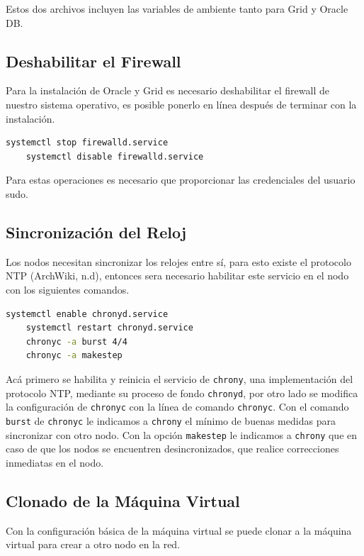 \documentclass{article}
\begin{document}
Estos dos archivos incluyen las variables de ambiente tanto para Grid y Oracle DB.

\subsection{Deshabilitar el Firewall}

Para la instalación de Oracle y Grid es necesario deshabilitar el firewall de nuestro sistema operativo, es posible ponerlo en línea después de terminar con la instalación.

\begin{lstlisting}[style=mystyle,language=bash]
	systemctl stop firewalld.service
	systemctl disable firewalld.service
\end{lstlisting}

Para estas operaciones es necesario que proporcionar las credenciales del usuario sudo.

\subsection{Sincronización del Reloj}

Los nodos necesitan sincronizar los relojes entre sí, para esto existe el protocolo NTP (ArchWiki, n.d), entonces sera necesario habilitar este servicio en el nodo con los siguientes comandos.

\begin{lstlisting}[style=mystyle,language=bash]
	systemctl enable chronyd.service
	systemctl restart chronyd.service
	chronyc -a burst 4/4
	chronyc -a makestep
\end{lstlisting}

Acá primero se habilita y reinicia el servicio de \texttt{chrony}, una implementación del protocolo NTP, mediante su proceso de fondo \texttt{chronyd}, por otro lado se modifica la configuración de \texttt{chronyc} con la línea de comando \texttt{chronyc}.
Con el comando \texttt{burst} de \texttt{chronyc} le indicamos a \texttt{chrony} el mínimo de buenas medidas para sincronizar con otro nodo. Con la opción \texttt{makestep} le indicamos a \texttt{chrony} que en caso de que los nodos se encuentren desincronizados, que realice correcciones inmediatas en el nodo.

\subsection{Clonado de la Máquina Virtual}

Con la configuración básica de la máquina virtual se puede clonar a la máquina virtual para crear a otro nodo en la red.
\end{document}
